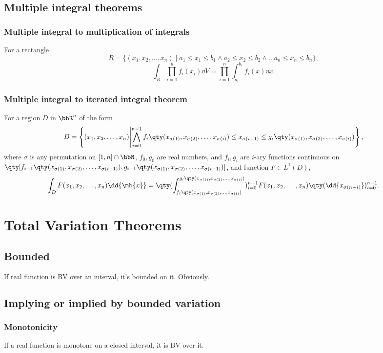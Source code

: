 \documentclass[a4paper,12pt]{report}
\begin{document}
\begin{itemize}
\begin{itemize}
\subsection{Multiple integral theorems}
\subsubsection{Multiple integral to multiplication of integrals}
For a rectangle
\[R=\{(x_1,x_2,\ldots,x_n)\mid a_1\le x_1\le b_1\land a_2\le x_2\le b_2\land\ldots a_n\le x_n\le b_n\},\]
\[\int_R\prod_{i=1}^nf_i(x_i)\dd{V}=\prod_{i=1}^n\int_{a_i}^{b_i}f_i(x)\dd{x}.\]
\subsubsection{Multiple integral to iterated integral theorem}
For a region $D$ in $\bbR^n$ of the form
\[D=\left\{(x_1,x_2,\ldots,x_n)\middle|\bigwedge_{i=0}^{n-1}f_i\qty(x_{\sigma(1)},x_{\sigma(2)},\ldots,x_{\sigma(i)})\le x_{\sigma(i+1)}\le g_i\qty(x_{\sigma(1)},x_{\sigma(2)},\ldots,x_{\sigma(i)})\right\},\]
where $\sigma$ is any permutation on $[1,n]\cap\bbN$, $f_0,g_0$ are real numbers, and $f_i,g_i$ are $i$-ary functions continuous on $\qty[f_{i-1}\qty(x_{\sigma(1)},x_{\sigma(2)},\ldots,x_{\sigma(i-1)}),g_{i-1}\qty(x_{\sigma(1)},x_{\sigma(2)},\ldots,x_{\sigma(i-1)})]$, and function $F\in L^1(D)$,
\[\int_DF(x_1,x_2,\ldots,x_n)\dd{\mb{x}}=\qty(\int_{f_i\qty(x_{\sigma(1)},x_{\sigma(2)},\ldots,x_{\sigma(i)})}^{g_i\qty(x_{\sigma(1)},x_{\sigma(2)},\ldots,x_{\sigma(i)})})_{i=0}^{n-1}F(x_1,x_2,\ldots,x_n)\qty(\dd{x_{\sigma(n-i)}})_{i=0}^{n-1}.\]



\section{Total Variation Theorems}
\subsection{Bounded}
If real function is BV over an interval, it's bounded on it.
\bpr
Obviously.
\epr
\subsection{Implying or implied by bounded variation}
\subsubsection{Monotonicity}
If a real function is monotone on a closed interval, it is BV over it.


\end{itemize}
\end{itemize}
\end{document}
